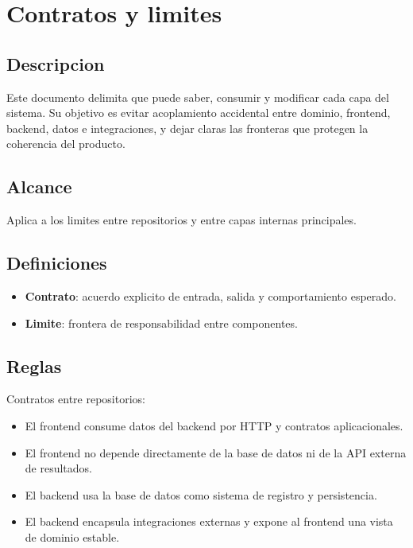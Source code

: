 \section{Contratos y limites}

\subsection{Descripcion}

Este documento delimita que puede saber, consumir y modificar cada capa del sistema. Su objetivo es evitar acoplamiento accidental entre dominio, frontend, backend, datos e integraciones, y dejar claras las fronteras que protegen la coherencia del producto.

\subsection{Alcance}

Aplica a los limites entre repositorios y entre capas internas principales.

\subsection{Definiciones}

\begin{itemize}
  \item \textbf{Contrato}: acuerdo explicito de entrada, salida y comportamiento esperado.
  \item \textbf{Limite}: frontera de responsabilidad entre componentes.
\end{itemize}

\subsection{Reglas}

Contratos entre repositorios:

\begin{itemize}
  \item El frontend consume datos del backend por HTTP y contratos aplicacionales.
  \item El frontend no depende directamente de la base de datos ni de la API externa de resultados.
  \item El backend usa la base de datos como sistema de registro y persistencia.
  \item El backend encapsula integraciones externas y expone al frontend una vista de dominio estable.
\end{itemize}

